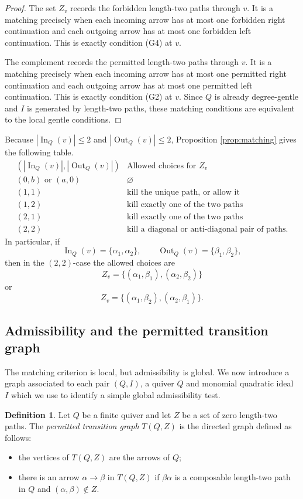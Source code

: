 \documentclass[11pt]{article}
\newcommand{\In}{\operatorname{In}}
\newcommand{\Out}{\operatorname{Out}}
\theoremstyle{plain}
\theoremstyle{definition}
\newtheorem{definition}[theorem]{Definition}
\theoremstyle{remark}
\begin{document}
\begin{proof}
The set \(Z_v\) records the forbidden length-two paths through \(v\).  It is a
matching precisely when each incoming arrow has at most one forbidden right
continuation and each outgoing arrow has at most one forbidden left
continuation.  This is exactly condition (G4) at \(v\).

The complement records the permitted length-two paths through \(v\).  It is a
matching precisely when each incoming arrow has at most one permitted right
continuation and each outgoing arrow has at most one permitted left
continuation.  This is exactly condition (G2) at \(v\).  Since \(Q\) is already
degree-gentle and \(I\) is generated by length-two paths, these matching
conditions are equivalent to the local gentle conditions.
\end{proof}

Because \(|\In_Q(v)|\leq 2\) and \(|\Out_Q(v)|\leq 2\), Proposition
\ref{prop:matching} gives the following table.
\[
\begin{array}{c|l}
(|\In_Q(v)|,|\Out_Q(v)|) & \text{Allowed choices for }Z_v \\
\hline
(0,b)\text{ or }(a,0) & \varnothing \\
(1,1) & \text{kill the unique path, or allow it} \\
(1,2) & \text{kill exactly one of the two paths} \\
(2,1) & \text{kill exactly one of the two paths} \\
(2,2) & \text{kill a diagonal or anti-diagonal pair of paths.}
\end{array}
\]
In particular, if
\[
  \In_Q(v)=\{\alpha_1,\alpha_2\},
  \qquad
  \Out_Q(v)=\{\beta_1,\beta_2\},
\]
then in the \((2,2)\)-case the allowed choices are
\[
  Z_v=\{(\alpha_1,\beta_1),(\alpha_2,\beta_2)\}
\]
or
\[
  Z_v=\{(\alpha_1,\beta_2),(\alpha_2,\beta_1)\}.
\]



\subsection{Admissibility and the permitted transition graph}

The matching criterion is local, but admissibility is global. We now introduce a graph associated to each pair $(Q,I)$, a quiver $Q$ and monomial quadratic ideal \(I\)  which we use to identify a simple global admissibility test.

\begin{definition}
Let \(Q\) be a finite quiver and let \(Z\) be a set of zero length-two paths.
The \emph{permitted transition graph} \(T(Q,Z)\) is the directed graph defined
as follows:
\begin{itemize}[leftmargin=2em]
  \item the vertices of \(T(Q,Z)\) are the arrows of \(Q\);
  \item there is an arrow \(\alpha\to \beta\) in \(T(Q,Z)\) if
  \(\beta\alpha\) is a composable length-two path in \(Q\) and
  \((\alpha,\beta)\notin Z\).
\end{itemize}
\end{definition}
\end{document}
